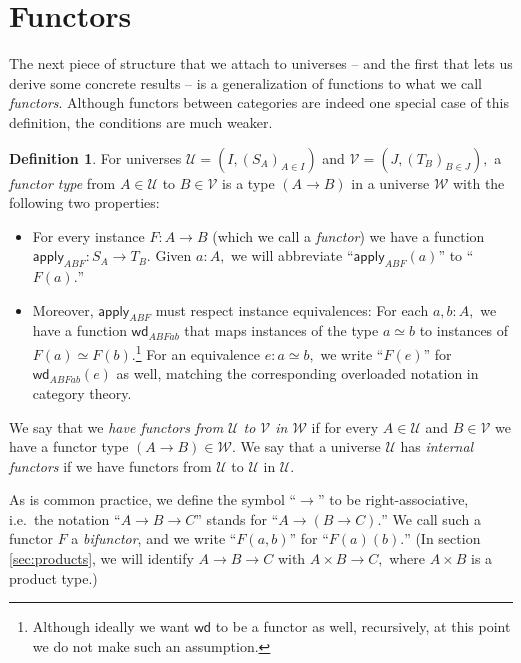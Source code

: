 \documentclass[a4paper]{article}
\theoremstyle{definition}
\newtheorem{definition}{Definition}[section]
\theoremstyle{remark}
\newcommand{\defn}{\emph}
\renewcommand{\equiv}{\simeq}
\newcommand{\U}{\mathcal{U}}
\newcommand{\V}{\mathcal{V}}
\newcommand{\W}{\mathcal{W}}
\newcommand{\nm}{\mathsf}
\newcommand{\apply}{\nm{apply}}
\newcommand{\congrArg}{\nm{wd}}
\begin{document}
\section{Functors}
\label{sec:functors}

The next piece of structure that we attach to universes -- and the first that lets us derive
some concrete results -- is a generalization of functions to what we call \defn{functors}.
Although functors between categories are indeed one special case of this definition, the
conditions are much weaker.

\begin{definition}
  For universes $\U = (I, (S_A)_{A \in I})$ and $\V = (J, (T_B)_{B \in J}),$ a
  \defn{functor type} from $A \in \U$ to $B \in \V$ is a type $(A \to B)$ in a universe $\W$
  with the following two properties:
  \begin{itemize}
    \item For every instance $F : A \to B$ (which we call a \defn{functor}) we have a
    function $\apply_{ABF} : S_A \to T_B.$ Given $a : A,$ we will abbreviate
    ``$\apply_{ABF}(a)$'' to ``$F(a).$''
    \item Moreover, $\apply_{ABF}$ must respect instance equivalences: For each
    $a,b : A,$ we have a function $\congrArg_{ABFab}$ that maps instances of the type
    $a \equiv b$ to instances of $F(a) \equiv F(b).$\footnote{Although ideally we want
    $\congrArg$ to be a functor as well, recursively, at this point we do not make such an
    assumption.}
    For an equivalence $e : a \equiv b,$ we write ``$F(e)$'' for $\congrArg_{ABFab}(e)$ as
    well, matching the corresponding overloaded notation in category theory.
  \end{itemize}
  
  We say that we \defn{have functors from $\U$ to $\V$ in $\W$} if for every $A \in \U$ and
  $B \in \V$ we have a functor type $(A \to B) \in \W.$
  We say that a universe $\U$ has \defn{internal functors} if we have functors from $\U$ to
  $\U$ in $\U.$

  As is common practice, we define the symbol ``$\to$'' to be right-associative, i.e.\ the
  notation ``$A \to B \to C$'' stands for ``$A \to (B \to C).$'' We call such a functor $F$ a
  \defn{bifunctor}, and we write ``$F(a,b)$'' for ``$F(a)(b).$'' (In section \ref{sec:products},
  we will identify $A \to B \to C$ with $A \times B \to C,$ where $A \times B$ is a product
  type.)
\end{definition}
\end{document}
